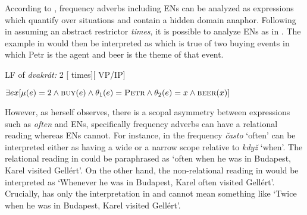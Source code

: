 \documentclass[output=paper,modfonts,hidelinks,newtxmath
\ChapterDOI{10.5281/zenodo.2545513}
]{langscibook}
\begin{document}
\ea\label{frequency-degree-adverbs} 
\z \z

\ea\label{event-degree-numerals} 
\z \z

\noindent According to \cite{von_fintel_restrictions_1994}, frequency adverbs including ENs can be analyzed as expressions which quantify over situations and contain a hidden domain anaphor. Following \cite{doetjes_adverbs_2007} in assuming an abstract restrictor \textit{times}, it is possible to analyze ENs as in . The example in  would then be interpreted as  which is true of two buying events in which Petr is the agent and beer is the theme of that event.

\ea\label{dvakrat-LF} LF of \textit{dvakrát:} 2 [ times][ VP/IP]
\z

\ea\label{dvakrat-interpretation} $\exists ex[\mu(e)=2 \wedge \textsc{buy}(e) \wedge \theta_1(e)=\textsc{Petr} \wedge \theta_2(e)=x \wedge \textsc{beer}(x)]$
\z 

\noindent However, as \cite{doetjes_adverbs_2007} herself observes, there is a scopal asymmetry between expressions such as \textit{often} and ENs, specifically frequency adverbs can have a relational reading whereas ENs cannot. For instance, in  the frequency  \textit{často} `often' can be interpreted either as having a wide or a narrow scope relative to \textit{když} `when'. The relational reading in  could be paraphrased as `often when he was in Budapest, Karel visited Gellért'. On the other hand, the non-relational reading in  would be interpreted as `Whenever he was in Budapest, Karel often visited Gellért'. Crucially,  has only the interpretation in  and cannot mean something like `Twice when he was in Budapest, Karel visited Gellért'.
\end{document}
